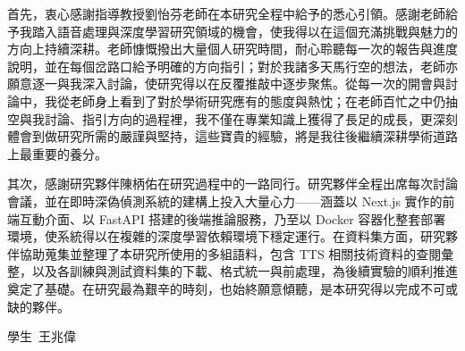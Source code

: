 首先，衷心感謝指導教授劉怡芬老師在本研究全程中給予的悉心引領。感謝老師給予我踏入語音處理與深度學習研究領域的機會，使我得以在這個充滿挑戰與魅力的方向上持續深耕。老師慷慨撥出大量個人研究時間，耐心聆聽每一次的報告與進度說明，並在每個岔路口給予明確的方向指引；對於我諸多天馬行空的想法，老師亦願意逐一與我深入討論，使研究得以在反覆推敲中逐步聚焦。從每一次的開會與討論中，我從老師身上看到了對於學術研究應有的態度與熱忱；在老師百忙之中仍抽空與我討論、指引方向的過程裡，我不僅在專業知識上獲得了長足的成長，更深刻體會到做研究所需的嚴謹與堅持，這些寶貴的經驗，將是我往後繼續深耕學術道路上最重要的養分。

其次，感謝研究夥伴陳柄佑在研究過程中的一路同行。研究夥伴全程出席每次討論會議，並在即時深偽偵測系統的建構上投入大量心力——涵蓋以 Next.js 實作的前端互動介面、以 FastAPI 搭建的後端推論服務，乃至以 Docker 容器化整套部署環境，使系統得以在複雜的深度學習依賴環境下穩定運行。在資料集方面，研究夥伴協助蒐集並整理了本研究所使用的多組語料，包含 TTS 相關技術資料的查閱彙整，以及各訓練與測試資料集的下載、格式統一與前處理，為後續實驗的順利推進奠定了基礎。在研究最為艱辛的時刻，也始終願意傾聽，是本研究得以完成不可或缺的夥伴。

\begin{flushright}
\mbox{學生 王兆偉}
\end{flushright}
